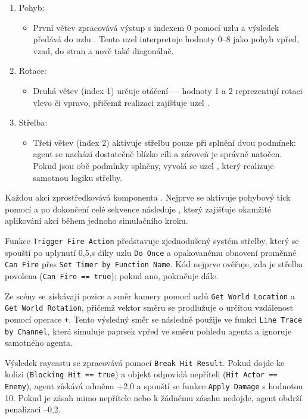 \begin{enumerate}
\item Pohyb:
\begin{itemize}
\item První větev zpracovává výstup s indexem 0 pomocí uzlu  a výsledek předává do uzlu . Tento uzel interpretuje hodnoty 0–8 jako pohyb vpřed, vzad, do stran a nově také diagonálně.
\end{itemize}
\item Rotace:
\begin{itemize}
\item Druhá větev (index 1) určuje otáčení — hodnoty 1 a 2 reprezentují rotaci vlevo či vpravo, přičemž realizaci zajišťuje uzel .
\end{itemize}
\item Střelba:
\begin{itemize}
\item Třetí větev (index 2) aktivuje střelbu pouze při splnění dvou podmínek: agent se nachází dostatečně blízko cíli a zároveň je správně natočen. Pokud jsou obě podmínky splněny, vyvolá se uzel , který realizuje samotnou logiku střelby.
\end{itemize}
\end{enumerate}

Každou akci zprostředkovává komponenta . Nejprve se aktivuje pohybový tick pomocí  a po dokončení celé sekvence následuje , který zajišťuje okamžité aplikování akcí během jednoho simulačního kroku.

Funkce \texttt{Trigger Fire Action} představuje zjednodušený systém střelby, který se spouští po uplynutí 0{,}5,s díky uzlu \texttt{Do Once} a opakovanému obnovení proměnné \texttt{Can Fire} přes \texttt{Set Timer by Function Name}. Kód nejprve ověřuje, zda je střelba povolena (\texttt{Can Fire == true}); pokud ano, pokračuje dále.

Ze scény se získávají pozice a směr kamery pomocí uzlů \texttt{Get World Location} a \texttt{Get World Rotation}, přičemž vektor směru se prodlužuje o určitou vzdálenost pomocí operace \texttt{+}. Tento výsledný směr se následně použije ve funkci \texttt{Line Trace by Channel}, která simuluje paprsek vpřed ve směru pohledu agenta a ignoruje samotného agenta.

\newpage

Výsledek raycastu se zpracovává pomocí \texttt{Break Hit Result}. Pokud dojde ke kolizi (\texttt{Blocking Hit == true}) a objekt odpovídá nepříteli (\texttt{Hit Actor == Enemy}), agent získává odměnu +2{,}0 a spouští se funkce \texttt{Apply Damage} s hodnotou 10. Pokud je zásah mimo nepřítele nebo k žádnému zásahu nedojde, agent obdrží penalizaci –0{,}2.


